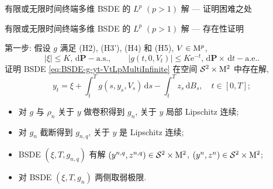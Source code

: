 \documentclass[xcolor=svgnames,serif,table,10pt]{beamer}
\newcommand{\As}{\mathrm{a.s.}}
\newcommand{\Ae}{\mathrm{a.e.}}
\newcommand*{\PR}{\mathrm{\mathbf{P}}}
\newcommand*{\dif}{\,\mathrm{d}}
\newcommand*{\prs}{\dif\PR-\As}
\newcommand*{\pts}{\dif\PR\times\dif t-\Ae}
\newcommand{\tT}[1][0]{[#1,T]}
\newcommand{\intT}[2][T]{\int^{#1}_{#2}}
\newcommand{\s}{\mathcal{S}}
\newcommand{\me}{\mathrm{e}}
\renewcommand{\M}{{\rm M}}
\begin{document}
\begin{frame}[t]{有限或无限时间终端多维 BSDE 的 $L^p$ $(p>1)$ 解 --- 证明困难之处}
\begin{center}
  \end{center}
\end{frame}

\begin{frame}[t]{有限或无限时间终端多维 BSDE 的 $L^p$ $(p>1)$ 解 --- 存在性证明}
\vspace{-2ex}
  \begin{block}{第一步: \hspace{1.5cm} }
    \qquad 假设 $g$ 满足 (H2), (H3'), (H4) 和 (H5), $V\in\M^p$,
    \begin{equation}\label{eq:AssumptionFirstStepLpMultiInfinite}
      |\xi|\leq K,\prs, \qquad |g(t,0,V_t)|\leq K\me^{-t},\pts.
    \end{equation}
    证明 BSDE \eqref{eq:BSDE-g-yt-VtLpMultiInfinite} 在空间 $\s^2\times\M^2$
    中存在解,
    \begin{equation}\label{eq:BSDE-g-yt-VtLpMultiInfinite}
      y_t=\xi+\intT{t}g(s,y_s,V_s)\dif s-\intT{t}z_s\dif B_s,\quad t\in\tT;
    \end{equation}
  \end{block}
  \pause
  \begin{itemize}
    \item 对 $g$ 与 $\rho_n$ 关于 $y$ 做\alert{卷积}得到 $g_n$, 关于 $y$ 局部 Lipschitz 连续;
    \item 对 $g_n$ \alert{截断}得到 $g_{n,q}$, 关于 $y$ 是 Lipschitz 连续;
    \item BSDE $(\xi,T,g_{n,q})$ 有解 $(y^{n,q},z^{n,q})\in\s^2\times\M^2$, $(y^{n},z^{n})\in\s^2\times\M^2$;
    \item 对 BSDE $(\xi,T,g_n)$ 两侧取\alert{弱极限}.
  \end{itemize}
\end{frame}
\end{document}

